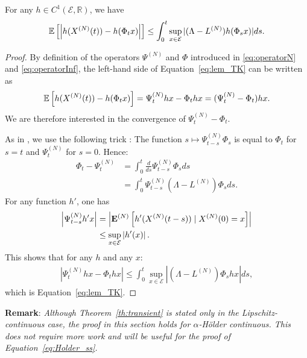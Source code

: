 \documentclass[sigconf]{acmart}
\newcommand\XN{X^{(N)}}
\newcommand\LN{L^{(N)}}
\newcommand\PsiN{\Psi^{(N)}}
\newcommand\E{\mathcal{E}}
\newcommand\R{\mathbb{R}}
\newcommand\esp[1]{{\mathchoice{\besp{#1}}{\sesp{#1}}{\sesp{#1}}{\sesp{#1}}}}
\newcommand\besp[1]{\mathbb{E}\left[#1\right]}
\newcommand\sesp[1]{\mathbb{E}[#1]}
\newcommand\espN[1]{{\mathchoice{\bespN{#1}}{\sespN{#1}}{\sespN{#1}}{\sespN{#1}}}}
\newcommand\bespN[1]{\mathbf{E}^{(N)}\left[#1\right]}
\newcommand\sespN[1]{\mathbf{E}^{(N)}[#1]}
\newcommand\abs[1]{\left|#1\right|}
\begin{document}
\begin{lemma}
  \label{lem:trotter-kurtz}
  For any $h\in C^{1}(\E,\R)$, we have
  \begin{align}
    \esp{\abs{h(\XN(t))-h(\Phi_tx)}} \le
    \int_0^t\sup_{x\in\E}|(\Lambda-\LN)h(\Phi_sx)|ds.
    \label{eq:lem_TK}
  \end{align}
\end{lemma}
\begin{proof}
  By definition of the operators $\PsiN$ and $\Phi$ introduced in
  \eqref{eq:operatorN} and \eqref{eq:operatorInf}, the left-hand side
  of Equation~\eqref{eq:lem_TK} can be written as
  \begin{align*}
    \esp{h(\XN(t))-h(\Phi_tx)} = \PsiN_thx-\Phi_thx =
    (\PsiN_t-\Phi_t)hx. 
  \end{align*}
  We are therefore interested in the convergence of
  $\PsiN_t-\Phi_t$. 

  As in \cite[Theorem~1]{kolokoltsov2011mean}, we use the following
  trick : The function $s\mapsto\PsiN_{t-s}\Phi_s$ is equal to
  $\Phi_t$ for $s=t$ and $\PsiN_t$ for $s=0$.  Hence:
  \begin{align}
    \Phi_t - \PsiN_t  &= \int_0^t \frac{d}{ds} \PsiN_{t-s}\Phi_s ds\nonumber\\
                       &=\int_0^t \PsiN_{t-s}(\Lambda-\LN)\Phi_sds. 
  \end{align}
  For any function $h'$, one has
  \begin{align*}
    \abs{\PsiN_{t-s}h'x} &= \abs{\espN{h'(\XN(t-s))\mid \XN(0)=x}} \\
                        &\le\sup_{x\in\E} \abs{h'(x)}. 
  \end{align*}
  This shows that for any $h$ and any $x$: 
  \begin{align*}
    \abs{\PsiN_thx -  \Phi_thx} \le \int_0^t\sup_{x\in\E}
    \abs{(\Lambda-\LN)\Phi_shx}ds,
  \end{align*}
  which is Equation~\eqref{eq:lem_TK}. 
  \end{proof}


\textbf{Remark}: \emph{ Although Theorem~\ref{th:transient} is stated
  only in the Lipschitz-continuous case, the proof in this section
  holds for $\alpha$-Hölder continuous. This does not require more
  work and will be useful for the proof of
  Equation~\eqref{eq:Holder_ss}.}
\end{document}
